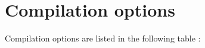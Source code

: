 \section{Compilation options}
Compilation options are listed in the following table :

\bigskip

\small

\tablelasttail{
  \hline
}


